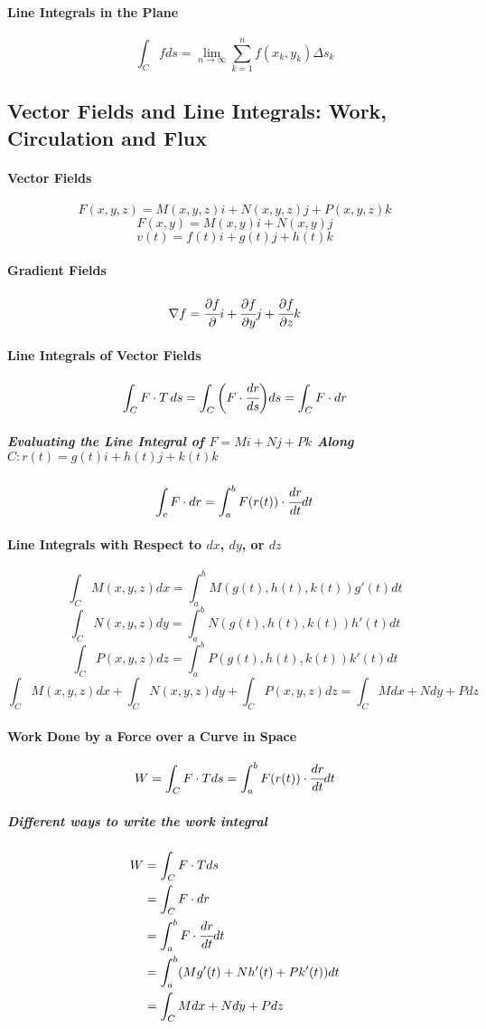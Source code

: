 \documentclass{article}
\begin{document}
            \paragraph{Line Integrals in the Plane}
                \[\int_Cfds=\lim\limits_{n\to\infty}\sum_{k=1}^nf(x_k,y_k)\Delta s_k\]
        \subsection{Vector Fields and Line Integrals: Work, Circulation and Flux}
            \paragraph{Vector Fields}
                \[F(x,y,z)=M(x,y,z)i+N(x,y,z)j+P(x,y,z)k\]
                \[F(x,y)=M(x,y)i+N(x,y)j\]
                \[v(t)=f(t)i+g(t)j+h(t)k\]
            \paragraph{Gradient Fields}
                \[\nabla f=\cfrac{\partial f}{\partial}i+\cfrac{\partial f}{\partial y}j+\cfrac{\partial f}{\partial z}k\]
            \paragraph{Line Integrals of Vector Fields}
                \[\int_CF\cdot T\, ds=\int_C\bigg(F\cdot\cfrac{dr}{ds}\bigg)ds=\int_CF\cdot dr\]
                \subparagraph{Evaluating the Line Integral of $F=Mi+Nj+Pk$ Along $C:r(t)=g(t)i+h(t)j+k(t)k$}
                \[\int_cF\cdot dr=\int_a^bF(r(t))\cdot\cfrac{dr}{dt}dt\]
            \paragraph{Line Integrals with Respect to $dx$, $dy$, or $dz$}
                \[\int_CM(x,y,z)dx=\int_a^bM(g(t),h(t),k(t))g'(t)dt\]
                \[\int_CN(x,y,z)dy=\int_a^bN(g(t),h(t),k(t))h'(t)dt\]
                \[\int_CP(x,y,z)dz=\int_a^bP(g(t),h(t),k(t))k'(t)dt\]
                \[\int_CM(x,y,z)dx+\int_CN(x,y,z)dy+\int_CP(x,y,z)dz=\int_CMdx+Ndy+Pdz\]
            \paragraph{Work Done by a Force over a Curve in Space}
                \[W=\int_CF\cdot Tds=\int_a^bF(r(t))\cdot\cfrac{dr}{dt}dt\]
                \subparagraph{Different ways to write the work integral}
                \begin{equation}
                    \begin{aligned}
                        W&=\int_CF\cdot Tds\\
                        &=\int_CF\cdot dr\\
                        &=\int_a^b F\cdot\cfrac{dr}{dt}dt\\
                        &=\int_a^b(Mg'(t)+Nh'(t)+Pk'(t))dt\\
                        &=\int_CMdx+Ndy+Pdz\\
                    \end{aligned}
                \end{equation}
\end{document}

